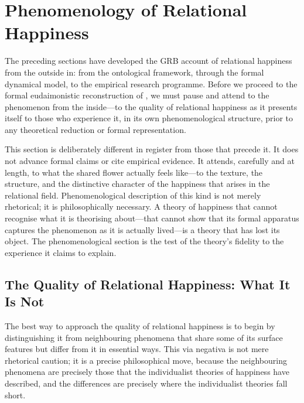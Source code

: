 \section{Phenomenology of Relational Happiness}
\label{p14:sec:phenomenology}

\noindent
The preceding sections have developed the GRB account of relational happiness from the outside in: from the ontological framework, through the formal dynamical model, to the empirical research programme. Before we proceed to the formal eudaimonistic reconstruction of , we must pause and attend to the phenomenon from the inside---to the quality of relational happiness as it presents itself to those who experience it, in its own phenomenological structure, prior to any theoretical reduction or formal representation.

This section is deliberately different in register from those that precede it. It does not advance formal claims or cite empirical evidence. It attends, carefully and at length, to what the shared flower actually feels like---to the texture, the structure, and the distinctive character of the happiness that arises in the relational field. Phenomenological description of this kind is not merely rhetorical; it is philosophically necessary. A theory of happiness that cannot recognise what it is theorising about---that cannot show that its formal apparatus captures the phenomenon as it is actually lived---is a theory that has lost its object. The phenomenological section is the test of the theory's fidelity to the experience it claims to explain.

\subsection{The Quality of Relational Happiness: What It Is Not}
\label{p14:subsec:notwhat}

\noindent
The best way to approach the quality of relational happiness is to begin by distinguishing it from neighbouring phenomena that share some of its surface features but differ from it in essential ways. This via negativa is not mere rhetorical caution; it is a precise philosophical move, because the neighbouring phenomena are precisely those that the individualist theories of happiness have described, and the differences are precisely where the individualist theories fall short.

